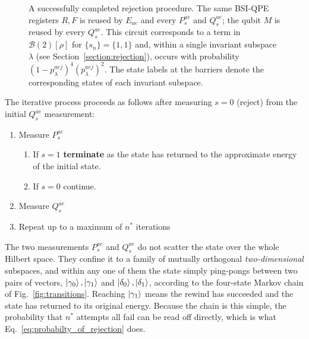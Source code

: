 \begin{figure}
\caption{A successfully completed rejection procedure. The same BSI-QPE registers $R, F$ is reused by $E_{ae}$ and every $P_s^{ae}$ and $Q_s^{ae}$; the qubit $M$ is reused by every $Q_s^{ae}$. This circuit corresponds to a term in $\mathcal{B}(2)[\rho]$ for $\{s_n\}=\{1,1\}$ and, within a single invariant subspace $\lambda$ (see Section~\ref{section:rejection}), occurs with probability $(1-p^{aej}_{\lambda})^4(p^{aej}_{\lambda})^2$. The state labels at the barriers denote the corresponding states of each invariant subspace.}
\label{fig:fullcircuit}
\end{figure}

The iterative process proceeds as follows after measuring $s=0$ (reject) from the initial $Q_s^{ae}$ measurement: 
\begin{enumerate}
    \item Measure $P_s^{ae}$
        \begin{enumerate}
            \item If $s=1$ \textbf{terminate} as the state has returned to the approximate energy of the initial state.
            \item If $s=0$ continue.
        \end{enumerate}
    \item Measure $Q_s^{ae}$
    \item Repeat up to a maximum of $n^*$ iterations
\end{enumerate}
The two measurements $P^{ae}_s$ and $Q^{ae}_s$ do not scatter the state over the whole Hilbert space. They confine it to a family of mutually orthogonal \emph{two-dimensional} subspaces, and within any one of them the state simply ping-pongs between two pairs of vectors, $\ket{\gamma_0},\ket{\gamma_1}$ and $\ket{\delta_0},\ket{\delta_1}$, according to the four-state Markov chain of Fig.~\ref{fig:transitions}. Reaching $\ket{\gamma_1}$ means the rewind has succeeded and the state has returned to its original energy. Because the chain is this simple, the probability that $n^*$ attempts all fail can be read off directly, which is what Eq.~\eqref{eq:probabilty_of_rejection} does. 

